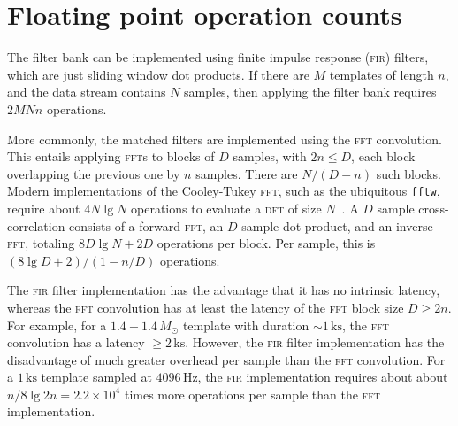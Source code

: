 \section{Floating point operation counts}

 The filter bank can be implemented using finite impulse response (\textsc{fir}) filters, which are just sliding window dot products.  If there are $M$ templates of length $n$, and the data stream contains $N$ samples, then applying the filter bank requires $2 M N n$ operations.

More commonly, the matched filters are implemented using the \textsc{fft} convolution.  This entails applying \textsc{fft}s to blocks of $D$ samples, with $2 n \leq D$, each block overlapping the previous one by $n$ samples.  There are $N/(D-n)$ such blocks.  Modern implementations of the Cooley-Tukey \textsc{fft}, such as the ubiquitous \texttt{fftw}, require about $4 N \lg N$ operations to evaluate a \textsc{dft} of size $N$~\cite{Johnson:2007p9654}.    A $D$ sample cross-correlation consists of a forward \textsc{fft}, an $D$ sample dot product, and an inverse \textsc{fft}, totaling $8 D \lg N + 2 D$ operations per block.  Per sample, this is $(8 \lg D + 2) / (1 - n/D)$ operations. 

The \textsc{fir} filter implementation has the advantage that it has no intrinsic latency, whereas the \textsc{fft} convolution has at least the latency of the \textsc{fft} block size $D \geq 2 n$.   For example, for a $1.4 - 1.4 \, M_\odot$ template with duration $\sim 1 \, \mathrm{ks}$, the \textsc{fft} convolution has a latency $\geq 2 \, \mathrm{ks}$.  However, the \textsc{fir} filter implementation has the disadvantage of much greater overhead per sample than the \textsc{fft} convolution.  For a $1\,\mathrm{ks}$ template sampled at $4096\,\mathrm{Hz}$, the \textsc{fir} implementation requires about about $n / 8 \lg 2 n = 2.2 \times 10^4$ times more operations per sample than the \textsc{fft} implementation.



